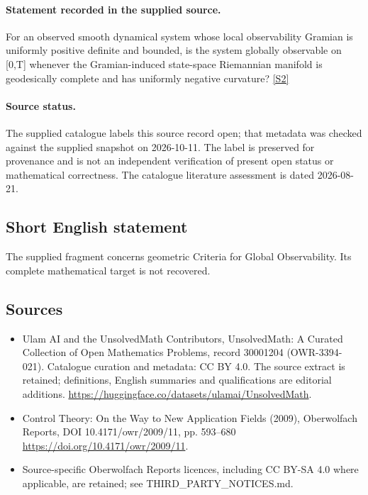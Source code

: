 \documentclass[11pt]{article}
\newcommand{\sref}[2]{\hyperlink{source:#1:#2}{[S#2]}}
\begin{document}
\paragraph{Statement recorded in the supplied source.}
For an observed smooth dynamical system whose local observability Gramian is uniformly positive definite and bounded, is the system globally observable on [0,T] whenever the Gramian-induced state-space Riemannian manifold is geodesically complete and has uniformly negative curvature? \sref{30001204}{2}
\paragraph{Source status.}
The supplied catalogue labels this source record open; that metadata was checked against the supplied snapshot on 2026-10-11. The label is preserved for provenance and is not an independent verification of present open status or mathematical correctness. The catalogue literature assessment is dated 2026-08-21.
\subsection{Short English statement}
The supplied fragment concerns geometric Criteria for Global Observability. Its complete mathematical target is not recovered.
\subsection{Sources}
\begin{itemize}
\item[\hypertarget{source:30001204:1}{S1}] Ulam AI and the UnsolvedMath Contributors, UnsolvedMath: A Curated Collection of Open Mathematics Problems, record 30001204 (OWR-3394-021). Catalogue curation and metadata: CC BY 4.0. The source extract is retained; definitions, English summaries and qualifications are editorial additions.
\url{https://huggingface.co/datasets/ulamai/UnsolvedMath}.
\item[\hypertarget{source:30001204:2}{S2}] Control Theory: On the Way to New Application Fields (2009), Oberwolfach Reports, DOI 10.4171/owr/2009/11, pp. 593--680
\url{https://doi.org/10.4171/owr/2009/11}.
\item Source-specific Oberwolfach Reports licences, including CC BY-SA 4.0 where applicable, are retained; see THIRD\_PARTY\_NOTICES.md.
\end{itemize}
\end{document}
